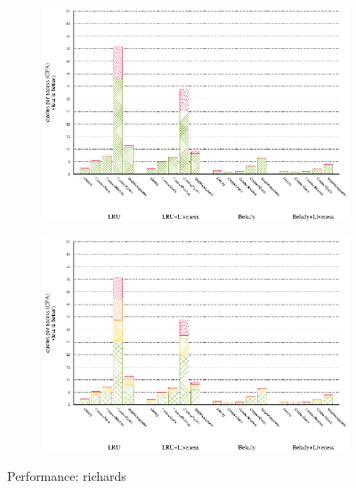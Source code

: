 \begin{figure}[!ht]
  \begin{subfigure}[b]{0.5\textwidth}%
    \includegraphics[width=\textwidth]{figs/plots/perf-misses-richards.eps}
  \end{subfigure}%
  \begin{subfigure}[b]{0.5\textwidth}%
    \includegraphics[width=\textwidth]{figs/plots/perf-richards.eps}
  \end{subfigure}%
  \caption{Performance: richards}
  \label{fig:performance-richards}
\end{figure}

